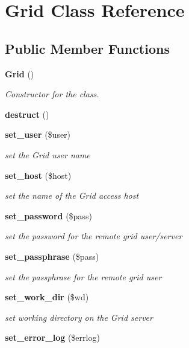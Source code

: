 \section{Grid Class Reference}
\label{classGrid}
\subsection*{Public Member Functions}
\begin{CompactItemize}
\item 
{\bf Grid} ()
\begin{CompactList}\small\item\em Constructor for the class. \item\end{CompactList}\item 
{\bf destruct} ()
\item 
{\bf set\_\-user} (\$user)
\begin{CompactList}\small\item\em set the Grid user name \item\end{CompactList}\item 
{\bf set\_\-host} (\$host)
\begin{CompactList}\small\item\em set the name of the Grid access host \item\end{CompactList}\item 
{\bf set\_\-password} (\$pass)
\begin{CompactList}\small\item\em set the password for the remote grid user/server \item\end{CompactList}\item 
{\bf set\_\-passphrase} (\$pass)
\begin{CompactList}\small\item\em set the passphrase for the remote grid user \item\end{CompactList}\item 
{\bf set\_\-work\_\-dir} (\$wd)
\begin{CompactList}\small\item\em set working directory on the Grid server \item\end{CompactList}\item 
{\bf set\_\-error\_\-log} (\$errlog)

\end{CompactItemize}
